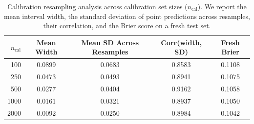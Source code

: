\begin{table}[ht]
	\centering
	\caption{Calibration resampling analysis across calibration set sizes ($n_{\text{cal}}$). We report the mean interval width, the standard deviation of point predictions across resamples, their correlation, and the Brier score on a fresh test set.}
	\label{tab:calibration_resampling}
	\vspace{8pt}
	\begin{tabular}{rcccc}
		\toprule
		$n_{\text{cal}}$ & Mean Width & Mean SD Across Resamples & Corr(width, SD) & Fresh Brier \\
		\midrule
		100 & 0.0899 & 0.0683 & 0.8583 & 0.1108 \\
		250 & 0.0473 & 0.0493 & 0.8941 & 0.1075 \\
		500 & 0.0277 & 0.0404 & 0.9162 & 0.1058 \\
		1000 & 0.0161 & 0.0321 & 0.8937 & 0.1050 \\
		2000 & 0.0092 & 0.0250 & 0.8984 & 0.1042 \\
		\bottomrule
	\end{tabular}
\end{table}
